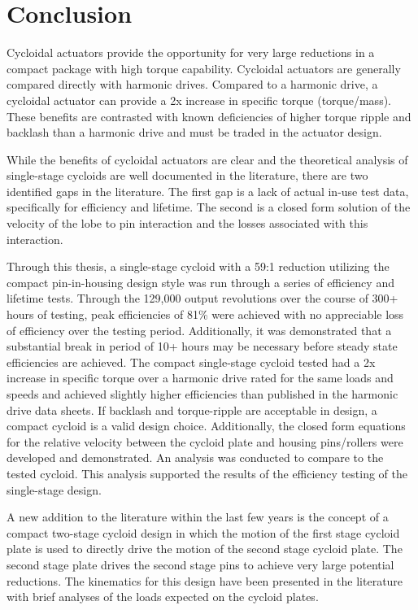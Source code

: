 
\chapter{Conclusion}\label{ch:conclusion}

Cycloidal actuators provide the opportunity for very large reductions in a compact package with high torque capability. Cycloidal actuators are generally compared directly with harmonic drives. Compared to a harmonic drive, a cycloidal actuator can provide a 2x increase in specific torque (torque/mass). These benefits are contrasted with known deficiencies of higher torque ripple and backlash than a harmonic drive and must be traded in the actuator design. 

While the benefits of cycloidal actuators are clear and the theoretical analysis of single-stage cycloids are well documented in the literature, there are two identified gaps in the literature. The first gap is a lack of actual in-use test data, specifically for efficiency and lifetime. The second is a closed form solution of the velocity of the lobe to pin interaction and the losses associated with this interaction. 

Through this thesis, a single-stage cycloid with a 59:1 reduction utilizing the compact pin-in-housing design style was run through a series of efficiency and lifetime tests. Through the 129,000 output revolutions over the course of 300+ hours of testing, peak efficiencies of 81\% were achieved with no appreciable loss of efficiency over the testing period. Additionally, it was demonstrated that a substantial break in period of 10+ hours may be necessary before steady state efficiencies are achieved. The compact single-stage cycloid tested had a 2x increase in specific torque over a harmonic drive rated for the same loads and speeds and achieved slightly higher efficiencies than published in the harmonic drive data sheets. If backlash and torque-ripple are acceptable in design, a compact cycloid is a valid design choice. Additionally, the closed form equations for the relative velocity between the cycloid plate and housing pins/rollers were developed and demonstrated. An analysis was conducted to compare to the tested cycloid. This analysis supported the results of the efficiency testing of the single-stage design.

A new addition to the literature within the last few years is the concept of a compact two-stage cycloid design in which the motion of the first stage cycloid plate is used to directly drive the motion of the second stage cycloid plate. The second stage plate drives the second stage pins to achieve very large potential reductions. The kinematics for this design have been presented in the literature with brief analyses of the loads expected on the cycloid plates. 

